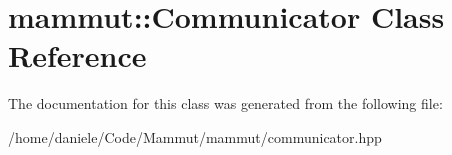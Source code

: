 \hypertarget{classmammut_1_1Communicator}{\section{mammut\-:\-:Communicator Class Reference}
\label{classmammut_1_1Communicator}
}


The documentation for this class was generated from the following file\-:\begin{DoxyCompactItemize}
\item 
/home/daniele/\-Code/\-Mammut/mammut/communicator.\-hpp\end{DoxyCompactItemize}
